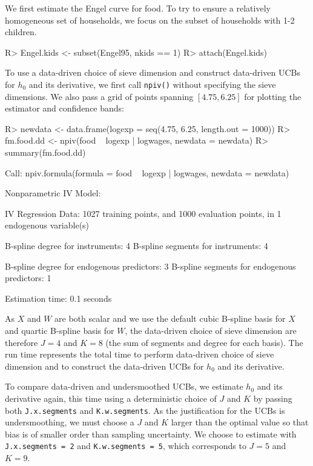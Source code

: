 \documentclass[
]{jss}
\begin{document}
We first estimate the Engel curve for food. To try to ensure a
relatively homogeneous set of households, we focus on the subset of
households with 1-2 children.

\begin{CodeChunk}
\begin{CodeInput}
R> Engel.kids <- subset(Engel95, nkids == 1)
R> attach(Engel.kids)
\end{CodeInput}
\end{CodeChunk}

To use a data-driven choice of sieve dimension and construct data-driven
UCBs for \(h_0\) and its derivative, we first call \texttt{npiv()}
without specifying the sieve dimensions. We also pass a grid of points
spanning \([4.75, 6.25]\) for plotting the estimator and confidence
bands:

\begin{CodeChunk}
\begin{CodeInput}
R> newdata <- data.frame(logexp = seq(4.75, 6.25, length.out = 1000))
R> fm.food.dd <- npiv(food ~ logexp | logwages, newdata = newdata)
R> summary(fm.food.dd)
\end{CodeInput}
\begin{CodeOutput}
Call:
npiv.formula(formula = food ~ logexp | logwages, newdata = newdata)

Nonparametric IV Model:

IV Regression Data: 1027 training points, and 1000 evaluation points, in 1 endogenous variable(s)

B-spline degree for instruments:             4
B-spline segments for instruments:           4

B-spline degree for endogenous predictors:   3
B-spline segments for endogenous predictors: 1

Estimation time: 0.1 seconds
\end{CodeOutput}
\end{CodeChunk}

As \(X\) and \(W\) are both scalar and we use the default cubic B-spline
basis for \(X\) and quartic B-spline basis for \(W\), the data-driven
choice of sieve dimension are therefore \(J = 4\) and \(K = 8\) (the sum
of segments and degree for each basis). The run time represents the
total time to perform data-driven choice of sieve dimension and to
construct the data-driven UCBs for \(h_0\) and its derivative.

To compare data-driven and undersmoothed UCBs, we estimate \(h_0\) and
its derivative again, this time using a deterministic choice of \(J\)
and \(K\) by passing both \texttt{J.x.segments} and
\texttt{K.w.segments}. As the justification for the UCBs is
undersmoothing, we must choose a \(J\) and \(K\) larger than the optimal
value so that bias is of smaller order than sampling uncertainty. We
choose to estimate with \texttt{J.x.segments\ =\ 2} and
\texttt{K.w.segments\ =\ 5}, which corresponds to \(J = 5\) and
\(K = 9\).
\end{document}
